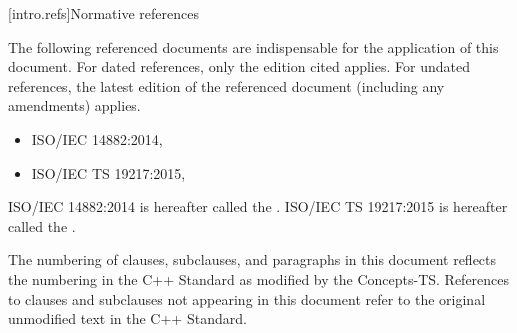
[intro.refs]{Normative references}

\pnum
The following referenced documents are indispensable for the application of this
document. For dated references, only the edition cited applies. For undated
references, the latest edition of the referenced document (including any
amendments) applies.

\begin{itemize}
\item ISO/IEC 14882:2014, 
\item ISO/IEC TS 19217:2015, 
\end{itemize}

\pnum
ISO/IEC 14882:2014 is hereafter called the . ISO/IEC TS 19217:2015 is hereafter called the .


\pnum
The numbering of clauses, subclauses, and paragraphs in this document reflects
the numbering in the C++ Standard as modified by the Concepts-TS.  References to clauses and subclauses not
appearing in this document refer to the original unmodified text
in the C++ Standard.
